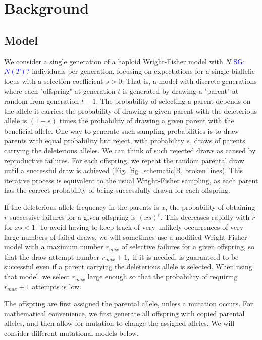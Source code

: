 \documentclass[9pt,twocolumn,twoside,lineno]{gsajnl}
\newcommand{\sgcomment}[1]{\textcolor{blue}{SG: #1}}
\begin{document}
\section{Background}
\label{sec_background}
\subsection{Model}
We consider a single generation of a haploid Wright-Fisher model with $N$ \sgcomment{$N(T)$?} individuals per generation, focusing on expectations for a single biallelic locus with a selection coefficient $s>0$. That is, a model with discrete generations where each "offspring" at generation $t$ is generated by drawing a "parent" at random from generation $t-1$.  The probability of selecting a parent depends on the allele it carries: the probability of drawing a given parent with the deleterious allele is $(1-s)$ times the probability of drawing a given parent with the beneficial allele.  
One way to generate such sampling probabilities is to draw parents with equal probability but reject, with probability $s$, draws of parents carrying the deleterious alleles. We can think of such rejected draws as caused by reproductive failures.   
For each offspring, we repeat the random parental draw until a successful draw is achieved (Fig.
\ref{fig_schematic}B, broken lines).
This iterative process is equivalent to the usual Wright-Fisher sampling, as each parent has the correct probability of being successfully drawn for each offspring.

If the deleterious allele frequency in the parents is $x$, the probability of obtaining $r$ successive failures for a given offspring is $(xs)^r.$ This decreases rapidly with $r$ for $xs<1.$ To avoid having to keep track of very unlikely occurrences of very large numbers of failed draws, we will sometimes use a modified Wright-Fisher model with a maximum number $r_{max}$ of selective failures for a given offspring, so that the draw attempt number $r_{max}+1,$ if it is needed, is guaranteed to be successful even if a parent carrying the deleterious allele is selected. When using that model, we select $r_{max}$ large enough so that the probability of requiring $r_{max}+1$ attempts is low.   
 
The offspring are first assigned the parental allele, unless a mutation occurs. For mathematical convenience, we first generate all offspring with copied parental alleles, and then allow for mutation to change the assigned alleles. We will consider different mutational models below. 
\end{document}
